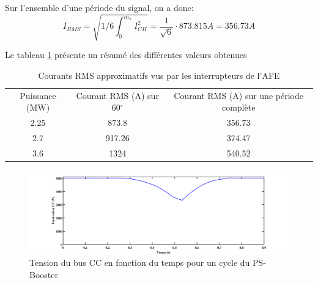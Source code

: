 Sur l'ensemble d'une période du signal, on a donc:
\begin{equation}
I_{RMS} =  \sqrt{1/6\int_0^{m_x} I_{CH}^2} = \frac{1}{\sqrt{6}}\cdot 873.815A = 356.73A
\end{equation}

Le tableau \ref{tab_Courant_AFE} présente un résumé des différentes valeurs obtenues

\begin{table}[htb]
\begin{tabular}{|c|c|c|}
\hline
\multirow{2}{*}{Puissance (MW)} & \multirow{2}{*}{Courant RMS (A) sur 60$^\circ$} & \multirow{2}{*}{Courant RMS (A) sur une période complète} \\
                                &                                                 &                                                           \\ \hline
2.25                            & 873.8                                           & 356.73                                                    \\ \hline
2.7                             & 917.26                                          & 374.47                                                    \\ \hline
3.6                             & 1324                                            & 540.52                                                    \\ \hline
\end{tabular}
\caption{Courants RMS approximatifs vus par les interrupteurs de l'AFE}
\label{tab_Courant_AFE}
\end{table}
\begin{figure}[htb]
\centering
\includegraphics[scale=0.35]{fig/fig_VbusCC.png}
\caption{Tension du bus CC en fonction du temps pour un cycle du PS-Booster}
\label{fig_Tension_BUSCC}
\end{figure}
